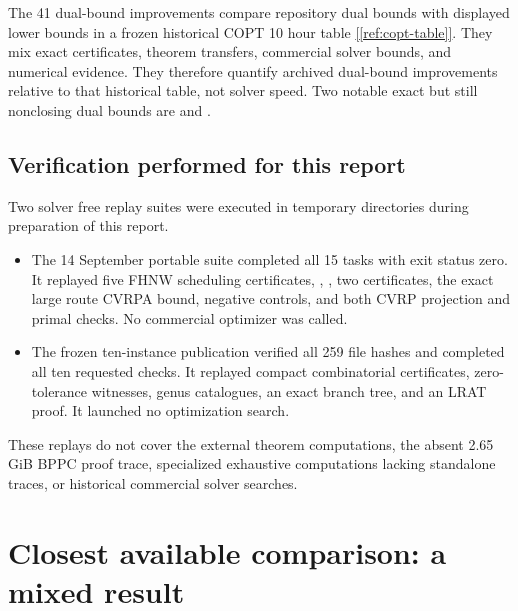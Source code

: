 \documentclass[11pt,letterpaper]{article}
\newcommand{\sourcecite}[1]{\hyperref[#1]{[\ref*{#1}]}}
\begin{document}
The 41 dual-bound improvements compare repository dual bounds with displayed lower bounds in a frozen historical COPT 10 hour table \sourcecite{ref:copt-table}. They mix exact certificates, theorem transfers, commercial solver bounds, and numerical evidence. They therefore quantify archived dual-bound improvements relative to that historical table, not solver speed. Two notable exact but still nonclosing dual bounds are \texttt{} and \texttt{}.

\subsection{Verification performed for this report}

Two solver free replay suites were executed in temporary directories during preparation of this report.

\begin{itemize}
\item The 14 September portable suite completed all 15 tasks with exit status zero. It replayed five FHNW scheduling certificates, \texttt{}, \texttt{}, two \texttt{} certificates, the exact large route CVRPA bound, negative controls, and both CVRP projection and primal checks. No commercial optimizer was called.
\item The frozen ten-instance publication verified all 259 file hashes and completed all ten requested checks. It replayed compact combinatorial certificates, zero-tolerance witnesses, genus catalogues, an exact branch tree, and an LRAT proof. It launched no optimization search.
\end{itemize}

These replays do not cover the external theorem computations, the absent 2.65 GiB BPPC proof trace, specialized exhaustive computations lacking standalone traces, or historical commercial solver searches.

\section{Closest available comparison: a mixed result}
\end{document}
